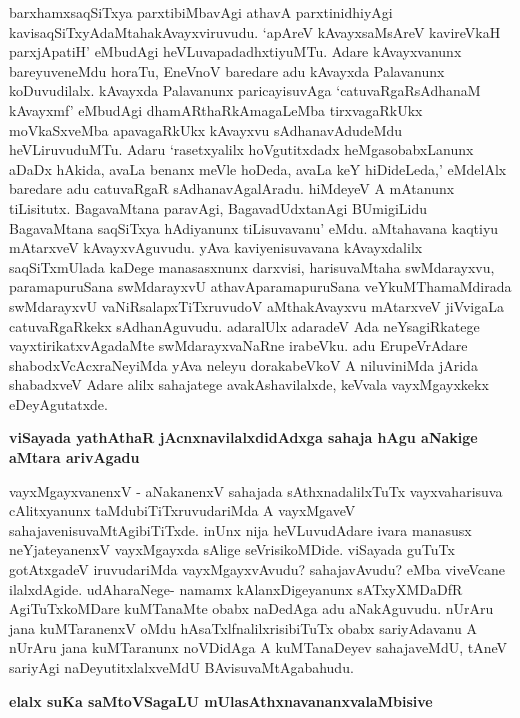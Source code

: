 \noindent
barxhamxsaqSiTxya parxtibiMbavAgi athavA parxtinidhiyAgi kavisaqSiTxyAdaMtaha\break kAvayxviruvudu. `apAreV kAvayxsaMsAreV kavireVkaH parxjApatiH'\label{page193} eMbudAgi heVLuva\break padadhxtiyuMTu. Adare kAvayxvanunx bareyuve\-neMdu horaTu, EneVnoV baredare adu kAvayxda Palavanunx koDuvudilalx. kAvayxda Palavanunx paricayisu\-vAga `catu\-vaRgaRsAdhanaM kAvayxmf'\label{193} eMbudAgi dhamARthaRkAmagaLeMba tirxvagaRkUkx moVkaSx\-veMba apavagaRkUkx kAvayxvu sAdhanavAdudeMdu heVLiruvuduMTu. Adaru `rasetx\-yalilx hoVgutitxdadx heMga\-sobabxLanunx aDaDx hAkida, avaLa benanx meVle hoDeda, avaLa keY hiDideLeda,' eMdelAlx baredare adu catu\-vaRgaR sAdhanavAgalAradu. hiMdeyeV A mAtanunx tiLisitutx. BagavaMtana paravAgi, BagavadUdxtanAgi BUmi\-giLidu BagavaMtana saqSiTxya hAdiyanunx tiLisuvavanu' eMdu. aMtahavana kaqtiyu mAtarxveV kAvayxvAguvudu. yAva kaviyenisuvavana kAvayxdalilx saqSiTxmUlada kaDege manasasxnunx darxvisi, harisu\-vaMtaha swMdarayxvu, paramapuruSana swMdarayxvU athavA\break paramapuruSana veYkuMThamaMdirada swMda\-rayxvU vaNiRsalapxTiTxruvudoV aMtha\break kAvayxvu mAtarxveV jiVvigaLa catuvaRgaRkekx sAdhanAguvudu. ada\-ralUlx adaradeV Ada neYsagiRkatege vayxtirikatxvAgadaMte swMdarayxvaNaRne irabeVku. adu Eru\-peVrA\-dare shabodxVcAcxraNeyiMda yAva neleyu dorakabeVkoV A niluviniMda jArida shabadxveV Adare alilx saha\-jatege avakAshavilalxde, keVvala vayxMgayxkekx eDeyAgutatxde.

{\bigskip
\noindent
{\large\bf viSayada yathAthaR jAcnxnavilalxdidAdxga sahaja hAgu aNakige aMtara arivAgadu}}\label{page194}
\medskip

\noindent
vayxMgayxvanenxV - aNakanenxV sahajada sAthxnadalilxTuTx vayxvaharisuva cAlitxyanunx taMdubiTiTxruvudariMda A vayxMgaveV sahajavenisuvaMtAgibiTiTxde. inUnx nija heVLuvudAdare ivara manasusx neYjateyanenxV vayxMgayxda sAlige seVrisikoMDide. viSayada guTuTx gotAtxgadeV iruvudariMda vayxMgayxvAvudu? sahajavAvudu? eMba viveVcane ilalxdAgide. udAharaNege- namamx kAlanxDigeyanunx sATxyXMDaDfR AgiTuTxkoMDare kuMTa\-naMte obabx naDedAga adu aNakAguvudu. nUrAru jana kuMTaranenxV oMdu hAsaTxlfnalilxrisibiTuTx obabx\- sariyAdavanu A nUrAru jana kuMTaranunx noVDidAga A kuMTanaDeyev sahajaveMdU, tAneV sariyAgi naDeyutitxlalxveMdU BAvisuvaMtAgabahudu.

{\bigskip
\noindent
{\large\bf elalx suKa saMtoVSagaLU mUlasAthxnavananxvalaMbisive}}\label{page194}
\smallskip

